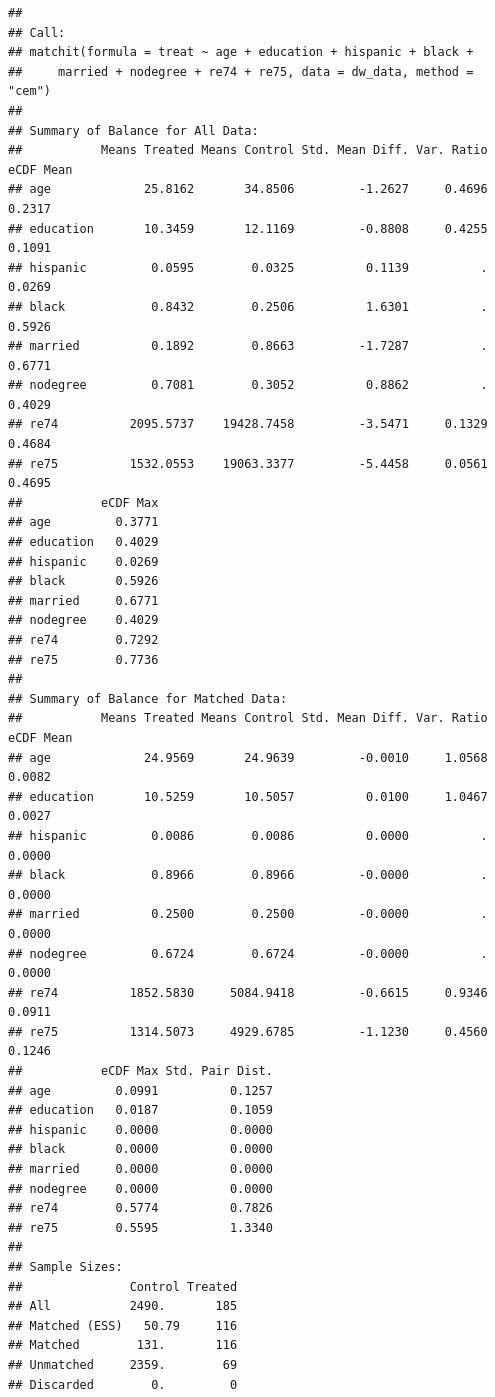 \documentclass[
]{article}
\begin{document}
\begin{verbatim}
## 
## Call:
## matchit(formula = treat ~ age + education + hispanic + black + 
##     married + nodegree + re74 + re75, data = dw_data, method = "cem")
## 
## Summary of Balance for All Data:
##           Means Treated Means Control Std. Mean Diff. Var. Ratio eCDF Mean
## age             25.8162       34.8506         -1.2627     0.4696    0.2317
## education       10.3459       12.1169         -0.8808     0.4255    0.1091
## hispanic         0.0595        0.0325          0.1139          .    0.0269
## black            0.8432        0.2506          1.6301          .    0.5926
## married          0.1892        0.8663         -1.7287          .    0.6771
## nodegree         0.7081        0.3052          0.8862          .    0.4029
## re74          2095.5737    19428.7458         -3.5471     0.1329    0.4684
## re75          1532.0553    19063.3377         -5.4458     0.0561    0.4695
##           eCDF Max
## age         0.3771
## education   0.4029
## hispanic    0.0269
## black       0.5926
## married     0.6771
## nodegree    0.4029
## re74        0.7292
## re75        0.7736
## 
## Summary of Balance for Matched Data:
##           Means Treated Means Control Std. Mean Diff. Var. Ratio eCDF Mean
## age             24.9569       24.9639         -0.0010     1.0568    0.0082
## education       10.5259       10.5057          0.0100     1.0467    0.0027
## hispanic         0.0086        0.0086          0.0000          .    0.0000
## black            0.8966        0.8966         -0.0000          .    0.0000
## married          0.2500        0.2500         -0.0000          .    0.0000
## nodegree         0.6724        0.6724         -0.0000          .    0.0000
## re74          1852.5830     5084.9418         -0.6615     0.9346    0.0911
## re75          1314.5073     4929.6785         -1.1230     0.4560    0.1246
##           eCDF Max Std. Pair Dist.
## age         0.0991          0.1257
## education   0.0187          0.1059
## hispanic    0.0000          0.0000
## black       0.0000          0.0000
## married     0.0000          0.0000
## nodegree    0.0000          0.0000
## re74        0.5774          0.7826
## re75        0.5595          1.3340
## 
## Sample Sizes:
##               Control Treated
## All           2490.       185
## Matched (ESS)   50.79     116
## Matched        131.       116
## Unmatched     2359.        69
## Discarded        0.         0
\end{verbatim}
\end{document}
